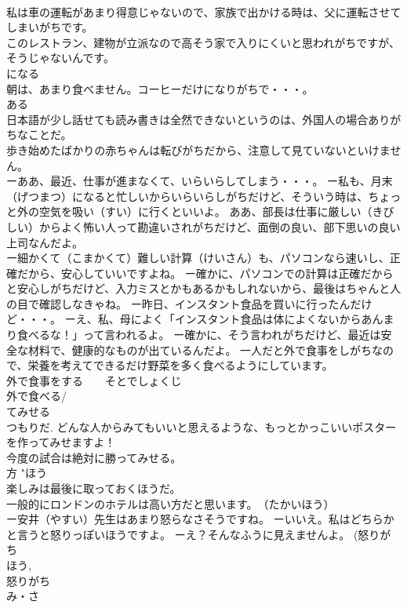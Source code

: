 \documentclass[8pt]{extreport}
\begin{document}
\begin{CJK}{UTF8}{min}
\\	私は車の運転があまり得意じゃないので、家族で出かける時は、父に運転させてしまいがちです。 
\\	このレストラン、建物が立派なので高そう家で入りにくいと思われがちですが、そうじゃないんです。 
\\	になる 
\\	朝は、あまり食べません。コーヒーだけになりがちで・・・。 
\\	ある 
\\	日本語が少し話せても読み書きは全然できないというのは、外国人の場合ありがちなことだ。 
\\	歩き始めたばかりの赤ちゃんは転びがちだから、注意して見ていないといけません。
\\	ーああ、最近、仕事が進まなくて、いらいらしてしまう・・・。 ー私も、月末（げつまつ）になると忙しいからいらいらしがちだけど、そういう時は、ちょっと外の空気を吸い（すい）に行くといいよ。 ああ、部長は仕事に厳しい（きびしい）からよく怖い人って勘違いされがちだけど、面倒の良い、部下思いの良い上司なんだよ。　
\\	ー細かくて（こまかくて）難しい計算（けいさん）も、パソコンなら速いし、正確だから、安心していいですよね。 ー確かに、パソコンでの計算は正確だからと安心しがちだけど、入力ミスとかもあるかもしれないから、最後はちゃんと人の目で確認しなきゃね。 ー昨日、インスタント食品を買いに行ったんだけど・・・。 ーえ、私、母によく「インスタント食品は体によくないからあんまり食べるな！」って言われるよ。 ー確かに、そう言われがちだけど、最近は安全な材料で、健康的なものが出ているんだよ。 一人だと外で食事をしがちなので、栄養を考えてできるだけ野菜を多く食べるようにしています。 
\\	外で食事をする　　そとでしょくじ 
\\	外で食べる/
\\	てみせる	
\\	つもりだ. どんな人からみてもいいと思えるような、もっとかっこいいポスターを作ってみせますよ！ 
\\	今度の試合は絶対に勝ってみせる。 
\\	方	"ほう 
\\	楽しみは最後に取っておくほうだ。 
\\	一般的にロンドンのホテルは高い方だと思います。　（たかいほう） 
\\	ー安井（やすい）先生はあまり怒らなさそうですね。 ーいいえ。私はどちらかと言うと怒りっぽいほうですよ。 ーえ？そんなふうに見えませんよ。 (怒りがち 
\\	ほう, 
\\	怒りがち 
\\	み・さ 

\end{CJK}
\end{document}
